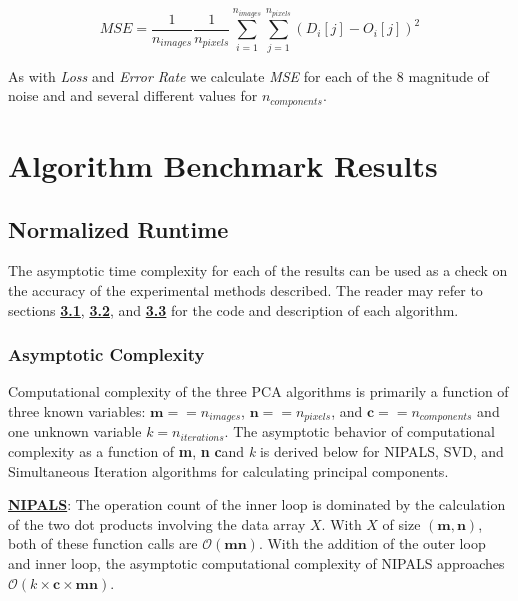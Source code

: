 \documentclass[12pt]{article}
\begin{document}
    $$ \textit{MSE} = \frac{1}{n_{images}}\frac{1}{n_{pixels}}\sum_{i=1}^{n_{images}}\sum_{j=1}^{n_{pixels}}(D_i[j] - O_i[j])^2$$

    As with \textit{Loss} and \textit{Error Rate} we calculate \textit{MSE} for each of the $8$ magnitude of noise and and several different values for $n_{components}$.


\section{Algorithm Benchmark Results}\label{5}

\subsection{Normalized Runtime}\label{5.1}

The asymptotic time complexity for each of the results can be used as a check on the accuracy of the experimental methods described. The reader may refer to sections \textbf{\hyperref[3.1]{3.1}}, \textbf{\hyperref[3.2]{3.2}}, and \textbf{\hyperref[3.3]{3.3}} for the code and description of each algorithm.

\subsubsection{Asymptotic Complexity}\label{5.1.1}

Computational complexity of the three PCA algorithms is primarily a function of three known variables: $\textbf{m} == n_{images}$, $\textbf{n} == n_{pixels}$, and $\textbf{c} == n_{components}$ and one unknown variable $\textit{k}=n_{iterations}$. The asymptotic behavior of computational complexity as a function of \textbf{m}, \textbf{n} \textbf{c}and \textit{k} is derived below for NIPALS, SVD, and Simultaneous Iteration algorithms for calculating principal components.

\textbf{\hyperref[3.1]{NIPALS}}: The operation count of the inner loop is dominated by the calculation of the two dot products involving the data array $X$. With $X$ of size $(\textbf{m}, \textbf{n})$, both of these function calls are $\mathcal{O}(\textbf{m}\textbf{n})$. With the addition of the outer loop and inner loop, the asymptotic computational complexity of NIPALS approaches $\mathcal{O}(k \times \textbf{c} \times \textbf{m}\textbf{n})$.
\end{document}
